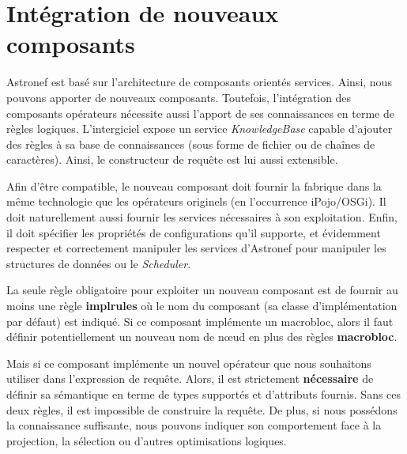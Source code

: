 \section{Intégration de nouveaux composants}\label{sec:contrib:astronef:integration}
Astronef est basé sur l'architecture de composants orientés services. Ainsi, nous pouvons apporter de nouveaux composants. Toutefois, l'intégration des composants opérateurs nécessite aussi l'apport de ses connaissances en terme de règles logiques. L'intergiciel expose un service \textit{KnowledgeBase} capable d'ajouter des règles à sa base de connaissances (sous forme de fichier ou de chaînes de caractères). Ainsi, le constructeur de requête est lui aussi extensible.

Afin d'être compatible, le nouveau composant doit fournir la fabrique dans la même technologie que les opérateurs originels (en l'occurrence iPojo/OSGi). Il doit naturellement aussi fournir les services nécessaires à son exploitation. Enfin, il doit spécifier les propriétés de configurations qu'il supporte, et évidemment respecter et correctement manipuler les services d'Astronef pour manipuler les structures de données ou le \textit{Scheduler}.

La seule règle obligatoire pour exploiter un nouveau composant est de fournir au moins une règle \textbf{implrules} où le nom du composant (sa classe d'implémentation par défaut) est indiqué. Si ce composant implémente un macrobloc, alors il faut définir potentiellement un nouveau nom de nœud en plus des règles \textbf{macrobloc}.

Mais si ce composant implémente un nouvel opérateur que nous souhaitons utiliser dans l'expression de requête. Alors, il est strictement \textbf{nécessaire} de définir sa sémantique en terme de types supportés et d'attributs fournis. Sans ces deux règles, il est impossible de construire la requête. De plus, si nous possédons la connaissance suffisante, nous pouvons indiquer son comportement face à la projection, la sélection ou d'autres optimisations logiques.
